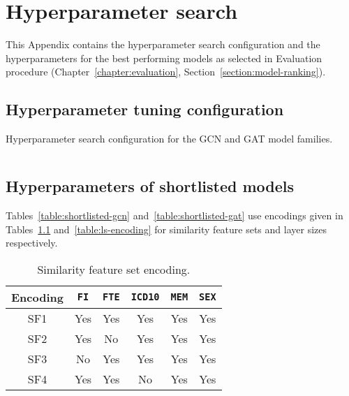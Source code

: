\chapter{Hyperparameter search}
\label{appendix:hyperparameters}

This Appendix contains the hyperparameter search configuration and the hyperparameters for the best performing models as selected in Evaluation procedure (Chapter~\ref{chapter:evaluation}, Section~\ref{section:model-ranking}).

\section{Hyperparameter tuning configuration}

\bigskip
\begin{code}
\caption{Hyperparameter search configuration for the GCN and GAT model families.}
\label{listing:sweep-config}
\medskip
\inputminted[frame=lines, linenos, breaklines=true, numberblanklines=false, style=colorful]{yaml}{code/sweep_config.yaml}
\end{code}

\section{Hyperparameters of shortlisted models}
Tables~\ref{table:shortlisted-gcn} and~\ref{table:shortlisted-gat} use encodings given in Tables~\ref{table:sf-encoding} and~\ref{table:ls-encoding} for similarity feature sets and layer sizes respectively.

\begin{table}[h]
    \caption{Similarity feature set encoding.}\label{table:sf-encoding}
    \centering
    \small
    \begin{tabular}{cccccc}
        \hline
    \textbf{Encoding} & \texttt{FI} &  \texttt{FTE}& \texttt{ICD10}& \texttt{MEM}& \texttt{SEX}\\  \hline
        SF1 & Yes & Yes & Yes & Yes & Yes \\
        SF2 & Yes & No & Yes & Yes & Yes \\
        SF3 & No & Yes & Yes & Yes & Yes \\
        SF4 & Yes & Yes & No & Yes & Yes \\ \hline
\end{tabular}
\end{table}

